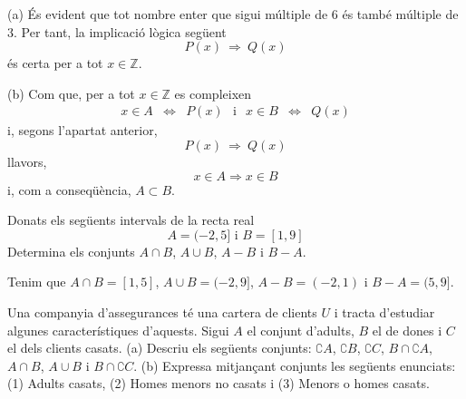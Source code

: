 \begin{solucio}
(a) És evident que tot nombre enter que sigui múltiple de $6$ és
també múltiple de $3$. Per tant, la implicació lògica següent%
\begin{equation*}
P(x)~\Longrightarrow ~Q(x)
\end{equation*}%
és certa per a tot $x\in \mathbb{Z}$.

(b) Com que, per a tot $x\in \mathbb{Z}$ es compleixen%
\begin{equation*}
\begin{array}{ccc}
x\in A & \Longleftrightarrow & P(x)%
\end{array}%
\text{ \ \ i \ \ }%
\begin{array}{ccc}
x\in B & \Longleftrightarrow & Q(x)%
\end{array}%
\end{equation*}%
i, segons l'apartat anterior,%
\begin{equation*}
P(x)~\Longrightarrow ~Q(x)
\end{equation*}%
llavors,%
\begin{equation*}
x\in A\Longrightarrow x\in B
\end{equation*}%
i, com a conseqüència, $A\subset B$.
\end{solucio}

\begin{exercici}
Donats els següents intervals de la recta real%
\begin{equation*}
A=(-2,5]\text{ \ \ \ i \ \ \ }B=[1,9]
\end{equation*}%
Determina els conjunts $A\cap B$, $A\cup B$, $A-B$ i $B-A$.
\end{exercici}

\begin{solucio}
Tenim que $A\cap B=[1,5]$, $A\cup B=(-2,9]$, $A-B=(-2,1)$ i $B-A=(5,9]$.
\end{solucio}

\begin{exercici}
Una companyia d'assegurances té una cartera de clients $U$ i tracta
d'estudiar algunes característiques d'aquests. Sigui $A$ el conjunt
d'adults, $B$ el de dones i $C$ el dels clients casats. (a) Descriu els següents conjunts: $\complement A$, $\complement B$, $\complement C$, $%
B\cap \complement A$, $A\cap B$, $A\cup B$ i $B\cap \complement C$. (b)
Expressa mitjançant conjunts les següents enunciats: (1) Adults
casats, (2) Homes menors no casats i (3) Menors o homes casats.
\end{exercici}


